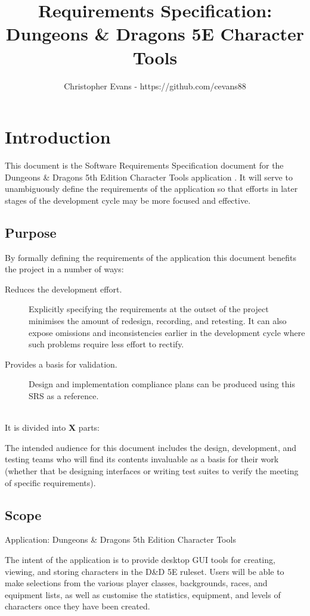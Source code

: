\documentclass{article}
\title{Requirements Specification: Dungeons \& Dragons 5E Character Tools}
\author{Christopher Evans - https://github.com/cevans88}
\begin{document}
\maketitle

\section{Introduction}

This document is the Software Requirements Specification document for the Dungeons \& Dragons 5th Edition Character Tools application . It will serve to unambiguously define the requirements of the application so that efforts in later stages of the development cycle may be more focused and effective.


\subsection{Purpose}

By formally defining the requirements of the application this document benefits the project in a number of ways:

\begin{description}
	\item [Reduces the development effort.] Explicitly specifying the requirements at the outset of the project minimises the amount of redesign, recording, and retesting. It can also expose omissions and inconsistencies earlier in the development cycle where such problems require less effort to rectify.
	\item [Provides a basis for validation.] Design and implementation compliance plans can be produced using this SRS as a reference.
\end{description}\\
It is divided into \textbf{X} parts:

The intended audience for this document includes the design, development, and testing teams who will find its contents invaluable as a basis for their work (whether that be designing interfaces or writing test suites to verify the meeting of specific requirements).


\subsection{Scope}

Application: Dungeons \& Dragons 5th Edition Character Tools

The intent of the application is to provide desktop GUI tools for creating, viewing, and storing characters in the D\&D 5E ruleset. Users will be able to make selections from the various player classes, backgrounds, races, and equipment lists, as well as customise the statistics, equipment, and levels of characters once they have been created.
\end{document}
